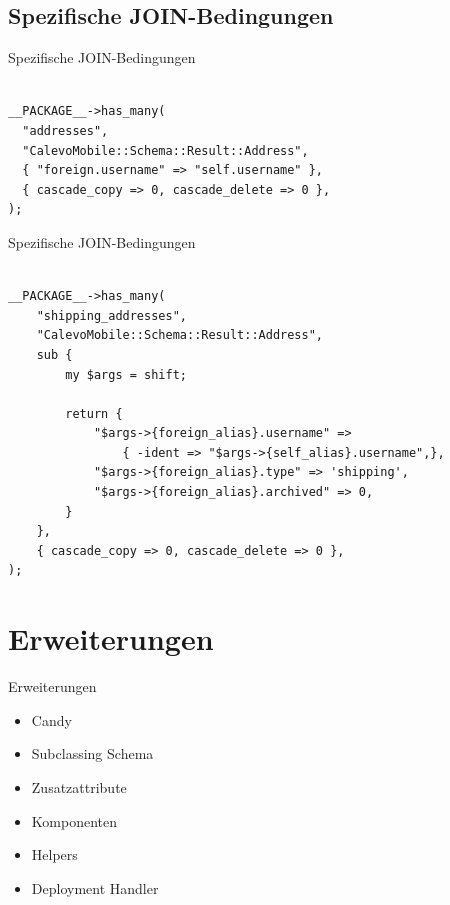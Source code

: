 \subsection{Spezifische JOIN-Bedingungen}

\begin{frame}[fragile]{Spezifische JOIN-Bedingungen}
\begin{lstlisting}

__PACKAGE__->has_many(
  "addresses",
  "CalevoMobile::Schema::Result::Address",
  { "foreign.username" => "self.username" },
  { cascade_copy => 0, cascade_delete => 0 },
);

\end{lstlisting}
\end{frame}

\begin{frame}[fragile]{Spezifische JOIN-Bedingungen}
\begin{lstlisting}

__PACKAGE__->has_many(
    "shipping_addresses",
    "CalevoMobile::Schema::Result::Address",
    sub {
        my $args = shift;

        return {
            "$args->{foreign_alias}.username" =>
                { -ident => "$args->{self_alias}.username",},
            "$args->{foreign_alias}.type" => 'shipping',
            "$args->{foreign_alias}.archived" => 0,
        }
    },
    { cascade_copy => 0, cascade_delete => 0 },
);
\end{lstlisting}
\end{frame}


\section{Erweiterungen}

\begin{frame}{Erweiterungen}
\begin{itemize}
\item Candy
\item Subclassing Schema
\item Zusatzattribute
\item Komponenten
\item Helpers
\item Deployment Handler
\end{itemize}
\end{frame}

